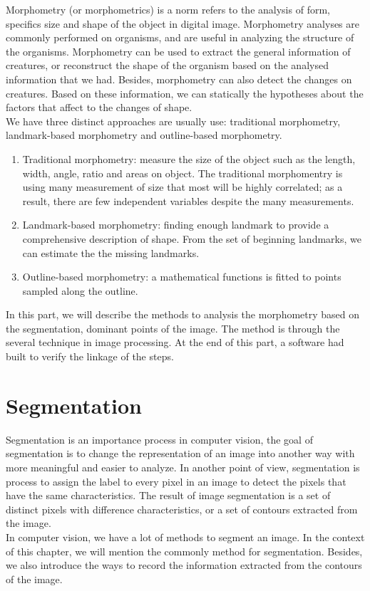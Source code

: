 Morphometry (or morphometrics) is a norm refers to the analysis of form, specifics size and shape of the object in digital image. Morphometry analyses are commonly performed on organisms, and are useful in analyzing the structure of the organisms. Morphometry can be used to extract the general information of creatures, or reconstruct the shape of the organism based on the analysed information that we had. Besides, morphometry can also detect the changes on creatures. Based on these information, we can statically the hypotheses about the factors that affect to the changes of shape.\\[0.2cm]
We have three distinct approaches are usually use: traditional morphometry, landmark-based morphometry and outline-based morphometry.
\begin{enumerate}
	\item Traditional morphometry:  measure the size of the object such as the length, width, angle, ratio and areas on object. The traditional morphomentry is using many measurement of size that most will be highly correlated; as a result, there are few independent variables despite the many measurements.
	\item Landmark-based morphometry: finding enough landmark to provide  a comprehensive description of shape. From the set of beginning landmarks, we can estimate the the missing landmarks.
	\item Outline-based morphometry: a mathematical functions is fitted to points sampled along the outline.
\end{enumerate}
In this part, we will describe the methods to analysis the morphometry based on the segmentation, dominant points of the image. The method is through the several technique in image processing. At the end of this part, a software had built to verify the linkage of the steps.
\chapter{Segmentation}
Segmentation is an importance process in computer vision, the goal of segmentation is to change the representation of an image into another way with more meaningful and easier to analyze. In another point of view, segmentation is process to assign the label to every pixel in an image to detect the pixels that have the same characteristics. The result of image segmentation is a set of distinct pixels with difference characteristics, or a set of contours extracted from the image.\\[0.2cm]
In computer vision, we have a lot of methods to segment an image. In the context of this chapter, we will mention the commonly method for segmentation. Besides, we also introduce the ways to record the information extracted from the contours of the image.
